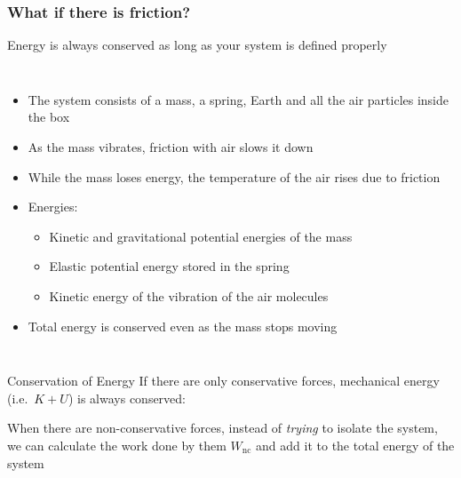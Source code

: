 \documentclass[12pt,compress,aspectratio=169]{beamer}
\newcommand{\eq}[2]{\vspace{#1}{\Large\begin{displaymath}#2\end{displaymath}}}
\begin{document}
\begin{frame}
  \frametitle{What if there is friction?}
  Energy is always conserved as long as your system is defined properly

  \begin{columns}
    \begin{itemize}
    \item The system consists of a mass, a spring, Earth and all the air
      particles inside the box
    \item As the mass vibrates, friction with air slows it down
    \item While the mass loses energy, the temperature of the air rises due to
      friction
    \item Energies:
      \begin{itemize}
      \item Kinetic and gravitational potential energies of the mass
      \item Elastic potential energy stored in the spring
      \item Kinetic energy of the vibration of the air molecules
      \end{itemize}
    \item Total energy is conserved even as the mass stops moving
    \end{itemize}
  \end{columns}
\end{frame}


\begin{frame}{Conservation of Energy}
  If there are only conservative forces, mechanical energy (i.e.\ $K+U$) is
  always conserved:

  \eq{-.2in}{
    \boxed{K +U =K'+U'}
  }
  
  When there are non-conservative forces, instead of \emph{trying} to isolate
  the system, we can calculate the work done by them $W_{\textrm{nc}}$ and
  add it to the total energy of the system
    
  \eq{-.2in}{
    \boxed{K+U+W_{\textrm{nc}}=K'+U'}
  }
  
\end{frame}
\end{document}
